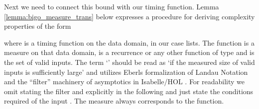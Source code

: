 \begin{isabellebody}
\begin{isamarkuptext}
Next we need to connect this bound with our timing function. Lemma \ref{lemma:bigo_measure_trans} below
expresses a procedure for deriving complexity properties of the form

\begin{quote}
\end{quote}

where  is a timing function on the data domain, in our case lists. The function  is a measure
on that data domain,  is a recurrence or any other function of type  and 
is the set of valid inputs. The term `' should be read as
`if the measured size of valid inputs is sufficiently large' and utilizes Eberls formalization of
Landau Notation \cite{eberl19issac} and the ``filter'' machinery of asymptotics in Isabelle/HOL
\cite{filter}. For readability we omit stating the filter and  explicitly in the following and
just state the  conditions required of the input . The measure  always corresponds to the
 function.

\begin{lemma} \label{lemma:bigo_measure_trans}
 \vskip 0pt
\end{lemma}

\begin{lemma}\label{lemma:recurrence}
 \vskip 0pt
\isa{{\isasymLongrightarrow}} 
\end{lemma}


\end{isamarkuptext}
\end{isabellebody}
